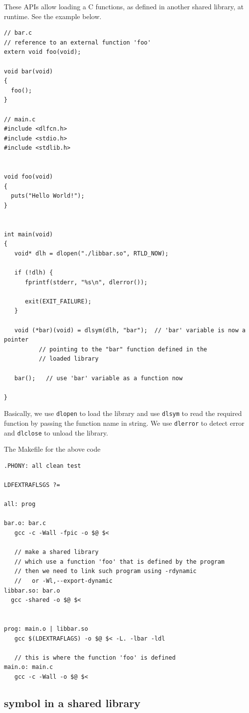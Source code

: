 These APIs allow loading a C functions, as defined in another shared library, at runtime.
See the example below.

\begin{lstlisting}
// bar.c 
// reference to an external function 'foo'
extern void foo(void);

void bar(void)
{
  foo();
}

// main.c
#include <dlfcn.h>
#include <stdio.h>
#include <stdlib.h>


void foo(void)
{
  puts("Hello World!");
}


int main(void)
{
   void* dlh = dlopen("./libbar.so", RTLD_NOW);
   
   if (!dlh) {
      fprintf(stderr, "%s\n", dlerror());
      
      exit(EXIT_FAILURE);
   }
   
   void (*bar)(void) = dlsym(dlh, "bar");  // 'bar' variable is now a pointer 
          // pointing to the "bar" function defined in the 
          // loaded library
          
   bar();   // use 'bar' variable as a function now
 
}
\end{lstlisting}

Basically, we use \verb!dlopen! to load the library and use
\verb!dlsym! to read the required function by passing the function
name in string. We use \verb!dlerror! to detect error and
\verb!dlclose! to unload the library.


The Makefile for the above code
\begin{verbatim}
.PHONY: all clean test

LDFEXTRAFLSGS ?= 

all: prog

bar.o: bar.c
   gcc -c -Wall -fpic -o $@ $<
   
   // make a shared library
   // which use a function 'foo' that is defined by the program
   // then we need to link such program using -rdynamic 
   //   or -Wl,--export-dynamic
libbar.so: bar.o
  gcc -shared -o $@ $<
  
  
prog: main.o | libbar.so
   gcc $(LDEXTRAFLAGS) -o $@ $< -L. -lbar -ldl
   
   // this is where the function 'foo' is defined
main.o: main.c
   gcc -c -Wall -o $@ $<
\end{verbatim}

\subsection{symbol in a shared library}
\label{sec:symbol-shared-library}


